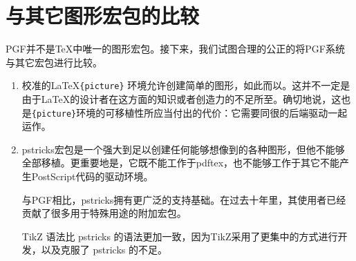 \section{与其它图形宏包的比较}
PGF并不是\TeX 中唯一的图形宏包。接下来，我们试图合理的公正的将PGF系统与其它宏包进行比较。
\begin{enumerate}
\item 校准的\LaTeX \lstinline${picture}$ 环境允许创建简单的图形，如此而以。这并不一定是由于\LaTeX 的设计者在这方面的知识或者创造力的不足所至。确切地说，这也是\lstinline${picture}$环境的可移植性所应当付出的代价：它需要同很的后端驱动一起运作。
\item pstricks宏包是一个强大到足以创建任何能够想像到的各种图形，但他不能够全部移植。更重要地是，它既不能工作于pdftex，也不能够工作于其它不能产生PostScript代码的驱动环境。

与PGF相比，pstricks拥有更广泛的支持基础。在过去十年里，其使用者已经贡献了很多用于特殊用途的附加宏包。

TikZ 语法比 pstricks 的语法更加一致，因为TikZ采用了更集中的方式进行开发，以及克服了 pstricks 的不足。
\end{enumerate}
\endinput